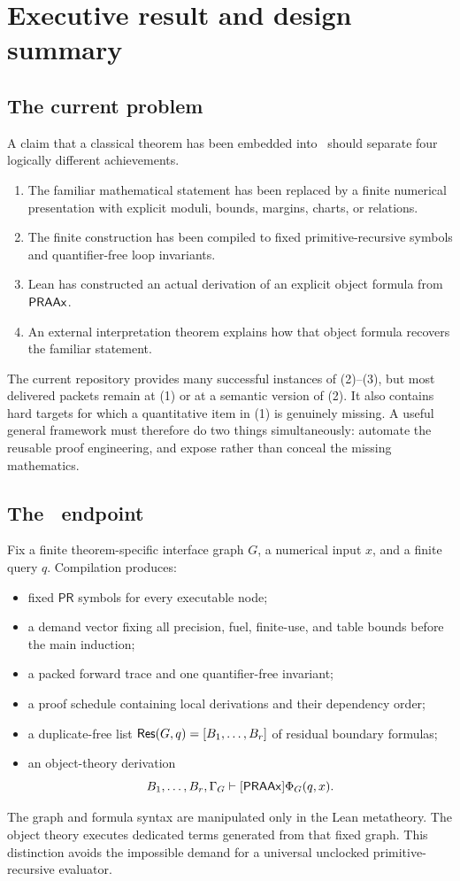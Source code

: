\section{Executive result and design summary}\label{sec:executive}

\subsection{The current problem}

A claim that a classical theorem has been embedded into \iPRA\ should separate four logically different achievements.
\begin{enumerate}[label=(\arabic*)]
  \item The familiar mathematical statement has been replaced by a finite numerical presentation with explicit moduli, bounds, margins, charts, or relations.
  \item The finite construction has been compiled to fixed primitive-recursive symbols and quantifier-free loop invariants.
  \item Lean has constructed an actual derivation of an explicit object formula from \(\mathsf{PRAAx}\).
  \item An external interpretation theorem explains how that object formula recovers the familiar statement.
\end{enumerate}
The current repository provides many successful instances of (2)--(3), but most delivered packets remain at (1) or at a semantic version of (2).  It also contains hard targets for which a quantitative item in (1) is genuinely missing.  A useful general framework must therefore do two things simultaneously: automate the reusable proof engineering, and expose rather than conceal the missing mathematics.

\subsection{The \KIFCR\ endpoint}

Fix a finite theorem-specific interface graph \(G\), a numerical input \(x\), and a finite query \(q\).  Compilation produces:
\begin{itemize}
  \item fixed \(\mathsf{PR}\) symbols for every executable node;
  \item a demand vector fixing all precision, fuel, finite-use, and table bounds before the main induction;
  \item a packed forward trace and one quantifier-free invariant;
  \item a proof schedule containing local derivations and their dependency order;
  \item a duplicate-free list \(\mathsf{Res}(G,q)=[B_1,\ldots,B_r]\) of residual boundary formulas;
  \item an object-theory derivation
  \[
      B_1,\ldots,B_r,\Gamma_G\vdash[\mathsf{PRAAx}]\Phi_G(q,x).
  \]
\end{itemize}
The graph and formula syntax are manipulated only in the Lean metatheory.  The object theory executes dedicated terms generated from that fixed graph.  This distinction avoids the impossible demand for a universal unclocked primitive-recursive evaluator.

